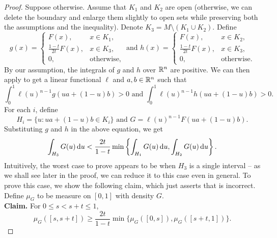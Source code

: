 \begin{proof}
	Suppose otherwise. Assume that $K_1$ and $K_2$ are open (otherwise, we can delete the boundary and enlarge them slightly to open sets while preserving both the assumptions and the inequality). Denote $K_3 = M\setminus(K_1\cup K_2)$. Define
	\[
		g(x) = 
		\begin{cases}
			F(x), & x\in K_1, \\
			\frac{1-t}{2t}F(x), & x\in K_3, \\
			0, & \text{otherwise},
		\end{cases}
		\text{ and }
		h(x) = 
		\begin{cases}
			F(x), & x\in K_2, \\
			\frac{1-t}{2t}F(x), & x\in K_3, \\
			0, & \text{otherwise}.
		\end{cases}
	\]
	By our assumption, the integrals of $g$ and $h$ over $\mathbb{R}^n$ are positive. We can then apply  to get a linear functional $\ell$ and $a,b\in\mathbb{R}^n$ such that
	\[ \int_0^1 \ell(u)^{n-1}g(ua+(1-u)b) > 0 \text{ and } \int_0^1 \ell(u)^{n-1}h(ua+(1-u)b) > 0. \]
	For each $i$, define
	\[ H_i = \{u : ua+(1-u)b \in K_i\} \text{ and } G = \ell(u)^{n-1}F(ua+(1-u)b). \]
	Substituting $g$ and $h$ in the above equation, we get
	\begin{equation}
	\label{eqn: cond iso ineq imp contradictory eqn}
		\int_{H_3} G(u)\operatorname{d}\!{u} < \frac{2t}{1-t} \min\left\{\int_{H_1} G(u)\operatorname{d}\!{u}, \int_{H_2} G(u)\operatorname{d}\!{u}\right\}.
	\end{equation}
	Intuitively, the worst case to prove appears to be when $H_3$ is a single interval -- as we shall see later in the proof, we can reduce it to this case even in general. To prove this case, we show the following claim, which just asserts that  is incorrect. Define $\mu_G$ to be measure on $[0,1]$ with density $G$.\\

	\textbf{Claim.} For $0\leq s < s+t\leq 1$,
	\begin{equation}
	\label{eqn: 4.15}
		\mu_G([s,s+t]) \geq \frac{2t}{1-t} \min\{\mu_G([0,s]),\mu_G([s+t,1])\}.	
	\end{equation}


\end{proof}
